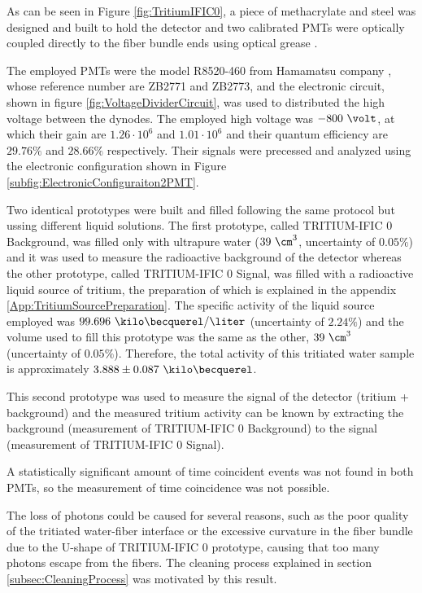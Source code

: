 As can be seen in Figure \ref{fig:TritiumIFIC0}, a piece of methacrylate and steel was designed and built to hold the detector and two calibrated PMTs were optically coupled directly to the fiber bundle ends using optical grease \cite{OpticalGrease}.

The employed PMTs were the model R8520-460 from Hamamatsu company \cite{DataSheetPMTs}, whose reference number are ZB2771 and ZB2773, and the electronic circuit, shown in figure \ref{fig:VoltageDividerCircuit}, was used to distributed the high voltage between the dynodes. The employed high voltage was $-800~\volt$, at which their gain are $1.26 \cdot{} 10^6$ and $1.01 \cdot{} 10^6$ and their quantum efficiency are $29.76\%$ and $28.66\%$ respectively. Their signals were precessed and analyzed using the electronic configuration shown in Figure \ref{subfig:ElectronicConfiguraiton2PMT}.

Two identical prototypes were built and filled following the same protocol but ussing different liquid solutions. The first prototype, called TRITIUM-IFIC 0 Background, was filled only with  ultrapure water ($39~\cm^3$, uncertainty of $0.05\%$) and it was used to measure the radioactive background of the detector whereas the other prototype, called TRITIUM-IFIC 0 Signal, was filled with a radioactive liquid source of tritium, the preparation of which is explained in the appendix \ref{App:TritiumSourcePreparation}. The specific activity of the liquid source employed was $99.696~\kilo\becquerel/\liter$ (uncertainty of $2.24\%$) and the volume used to fill this prototype was the same as the other, $39~\cm^3$ (uncertainty of $0.05\%$). Therefore, the total activity of this tritiated water sample is approximately $3.888 \pm 0.087~\kilo\becquerel$. 

This second prototype was used to measure the signal of the detector (tritium + background) and the measured tritium activity can be known by extracting the background (measurement of TRITIUM-IFIC 0 Background) to the signal (measurement of TRITIUM-IFIC 0 Signal).

A statistically significant amount of time coincident events was not found in both PMTs, so the measurement of time coincidence was not possible. 

The loss of photons could be caused for several reasons, such as the poor quality of the tritiated water-fiber interface or the excessive curvature in the fiber bundle due to the U-shape of TRITIUM-IFIC 0 prototype, causing that too many photons escape from the fibers. The cleaning process explained in section \ref{subsec:CleaningProcess} was motivated by this result.

